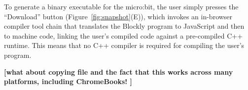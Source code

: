 To generate a binary executable for the micro:bit, the user
simply presses the ``Download'' button (Figure~\ref{fig:snapshot}(E)),
which invokes an in-browser compiler tool chain that translates
the Blockly program to JavaScript and then to machine code, linking
the user's compiled code against a pre-compiled
C++ runtime. This means that no C++ compiler is required for
compiling the user's program.

{\bf [what about copying file and the fact that this works across many
platforms, including ChromeBooks! ]}









